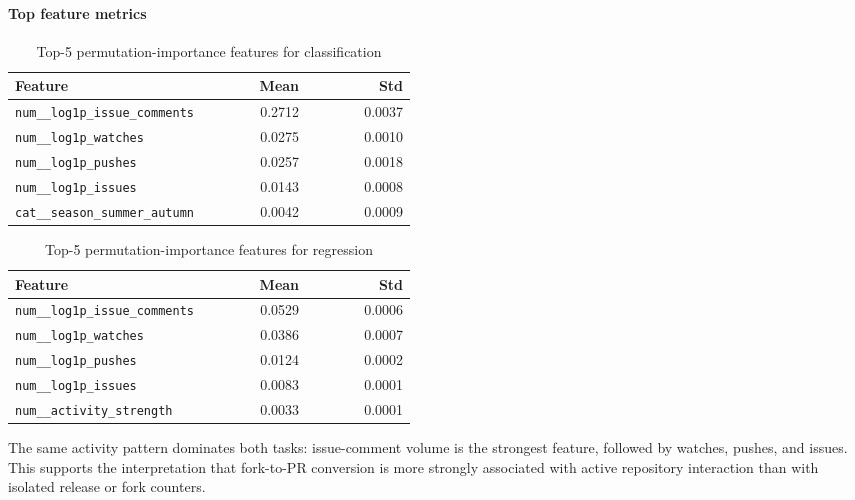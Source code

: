 \paragraph{Top feature metrics}
\begin{table}[H]
\centering
\footnotesize
\setlength{\tabcolsep}{5pt}
\begin{tabular}{@{}>{\raggedright\arraybackslash}p{0.48\linewidth}rr@{}}
\hline
Feature & Mean & Std \\
\hline
\texttt{num\_\_log1p\_issue\_comments} & 0.2712 & 0.0037 \\
\texttt{num\_\_log1p\_watches} & 0.0275 & 0.0010 \\
\texttt{num\_\_log1p\_pushes} & 0.0257 & 0.0018 \\
\texttt{num\_\_log1p\_issues} & 0.0143 & 0.0008 \\
\texttt{cat\_\_season\_summer\_autumn} & 0.0042 & 0.0009 \\
\hline
\end{tabular}
\caption{Top-5 permutation-importance features for classification}
\label{tab:modeling_top5_classification_features}
\end{table}

\begin{table}[H]
\centering
\footnotesize
\setlength{\tabcolsep}{5pt}
\begin{tabular}{@{}>{\raggedright\arraybackslash}p{0.48\linewidth}rr@{}}
\hline
Feature & Mean & Std \\
\hline
\texttt{num\_\_log1p\_issue\_comments} & 0.0529 & 0.0006 \\
\texttt{num\_\_log1p\_watches} & 0.0386 & 0.0007 \\
\texttt{num\_\_log1p\_pushes} & 0.0124 & 0.0002 \\
\texttt{num\_\_log1p\_issues} & 0.0083 & 0.0001 \\
\texttt{num\_\_activity\_strength} & 0.0033 & 0.0001 \\
\hline
\end{tabular}
\caption{Top-5 permutation-importance features for regression}
\label{tab:modeling_top5_regression_features}
\end{table}

The same activity pattern dominates both tasks: issue-comment volume is the strongest feature, followed by watches, pushes, and issues. This supports the interpretation that fork-to-PR conversion is more strongly associated with active repository interaction than with isolated release or fork counters.

